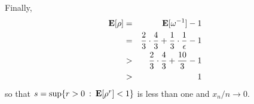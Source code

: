 \documentclass[11pt]{article} \usepackage{amssymb}
\newcommand{\E}{{\bf E}} \newcommand{\Cov}{{\bf Cov}}
\begin{document}
Finally,
\begin{eqnarray*}
  \E[\rho]&=&\E[\omega^{-1}]-1\\
  &=&{2\over 3}\cdot{4\over 3}+{1\over 3}\cdot{1\over \epsilon}-1\\
  &>&{2\over 3}\cdot{4\over 3}+{10\over 3}-1\\
  &>&1
\end{eqnarray*}
so that $s=\sup\{r>0\::\:\E[\rho^r]<1\}$ is less than one and $x_n/n\to0$.

\section{}
\end{document}

